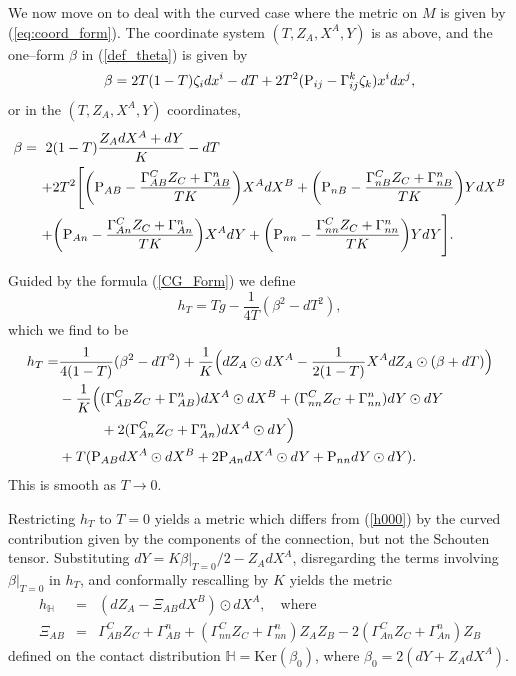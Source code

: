 We now move on to deal with the
curved case where the metric on $M$ is given by 
(\ref{eq:coord_form}).
The coordinate system $(T, Z_A, X^A, Y)$ is as above, and
the one--form $\beta$ in (\ref{def_theta}) is given by
\[
\beta=2T(1-T)\zeta_idx^i-dT+2T^2(\mathrm{P}_{ij}-\Gamma_{ij}^k\zeta_k)x^idx^j,
\]
or in the $(T, Z_A, X^A, Y)$ coordinates,
\[
\begin{split}
\beta=\ 2&(1-T)\frac{Z_AdX^A+dY}{K} - dT \\
+& 2T^2\Bigg[\bigg(\mathrm{P}_{AB}-\frac{\Gamma^C_{AB}Z_C+\Gamma^n_{AB}}{TK}\bigg)X^AdX^B 
+\bigg(\mathrm{P}_{nB}-\frac{\Gamma^C_{nB}Z_C+\Gamma^n_{nB}}{TK}\bigg)YdX^B \\
+& \bigg(\mathrm{P}_{An}-\frac{\Gamma^C_{An}Z_C+\Gamma^n_{An}}{TK}\bigg)X^AdY 
+\bigg(\mathrm{P}_{nn}-\frac{\Gamma^C_{nn}Z_C+\Gamma^n_{nn}}{TK}\bigg)YdY\Bigg].
\end{split}
\]

Guided by the formula (\ref{CG_Form}) we define
\[
h_T=Tg-\frac{1}{4T}(\beta^2-dT^2),
\]
which we find to be
\begin{equation*}
\begin{split}
h_T=&
\frac{1}{4(1-T)}(\beta^2-dT^2)+\frac{1}{K}\Big(dZ_A\odot dX^A-\frac{1}{2(1-T)}
X^A dZ_A\odot (\beta+dT)\Big)\\
&-\frac{1}{K}\Big(
(\Gamma_{AB}^CZ_C+\Gamma_{AB}^n)dX^A\odot dX^B+
(\Gamma_{nn}^CZ_C+\Gamma_{nn}^n)dY\odot dY \\
&\qquad\quad + 2(\Gamma_{An}^CZ_C+\Gamma_{An}^n)dX^A\odot dY\Big)\\
&+T(\mathrm{P}_{AB}dX^A\odot dX^B+2\mathrm{P}_{An}dX^A\odot dY+\mathrm{P}_{nn}dY\odot dY).
\end{split}
\end{equation*}
This is  smooth as $T\rightarrow 0$.

Restricting $h_T$ to $T=0$ yields a metric which differs from
(\ref{h000}) by the curved contribution given by the components of the  connection, but not the Schouten tensor. Substituting $dY=K\beta|_{T=0}/2-Z_AdX^A$, disregarding the terms involving $\beta|_{T=0}$ in $h_T$, and conformally rescalling by 
$K$ yields the metric
\begin{eqnarray}
\label{met_th}
h_{ \mathbb{H} }&=&(dZ_A-\Xi_{AB}dX^B)\odot dX^A,\quad
\mbox{where}\\
\Xi_{AB}&=&\Gamma_{AB}^CZ_C+\Gamma_{AB}^n+
(\Gamma_{nn}^CZ_C+\Gamma_{nn}^n)Z_AZ_B-
2(\Gamma_{An}^CZ_C+\Gamma_{An}^n)Z_B\nonumber
\end{eqnarray}
defined on the contact distribution ${ \mathbb{H} }=\mbox{Ker}(\beta_0)$, 
where $\beta_0=2(dY+Z_AdX^A)$.

